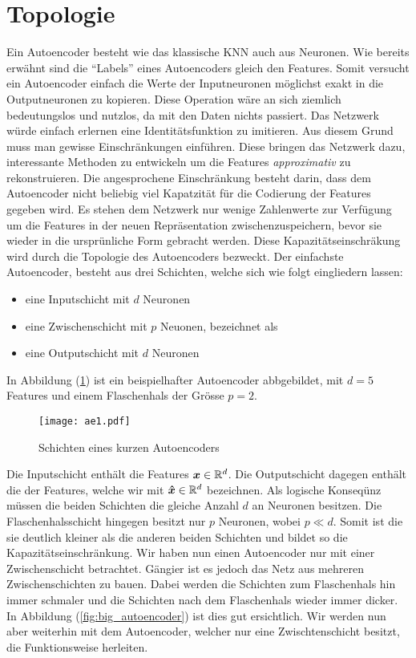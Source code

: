 \section{Topologie}
Ein Autoencoder besteht wie das klassische KNN auch aus Neuronen.
Wie bereits erwähnt sind die ``Labels'' eines Autoencoders gleich
den Features. Somit versucht ein Autoencoder einfach die Werte der Inputneuronen
möglichst exakt in die Outputneuronen zu kopieren.
Diese Operation wäre an sich ziemlich bedeutungslos und nutzlos, da mit den
Daten nichts passiert. Das Netzwerk würde einfach erlernen eine
Identitätsfunktion zu imitieren.
Aus diesem Grund muss man gewisse Einschränkungen einführen. Diese bringen das Netzwerk dazu,
interessante Methoden zu entwickeln um die Features \textit{approximativ} zu rekonstruieren.
\para{}
Die angesprochene Einschränkung besteht darin, dass dem Autoencoder nicht
beliebig viel Kapatzität für die Codierung der Features gegeben wird.
Es stehen dem Netzwerk nur wenige Zahlenwerte zur Verfügung um die Features
in der neuen Repräsentation zwischenzuspeichern, bevor sie wieder in die ursprünliche Form gebracht werden.
Diese Kapazitätseinschräkung wird durch die Topologie des Autoencoders bezweckt.
\para{}
\bigskip
Der einfachste Autoencoder, besteht aus drei Schichten, welche sich wie folgt
eingliedern lassen:
\begin{itemize}
\item{eine Inputschicht mit $d$ Neuronen}
\item{eine Zwischenschicht mit $p$ Neuonen, bezeichnet als }
\item{eine Outputschicht mit $d$ Neuronen}
\end{itemize}
In Abbildung (\ref{fig:basic_autoencoder}) ist
ein beispielhafter Autoencoder abbgebildet, mit $d = 5$ Features und einem
Flaschenhals der Grösse $p = 2$.
\begin{figure}[h!]
  \centering
  \texttt{[image: ae1.pdf]}
  \caption{Schichten eines kurzen Autoencoders}
  \label{fig:basic_autoencoder}
\end{figure}
\para{}
Die Inputschicht enthält die Features $\bm{x} \in \mathbb{R}^d$. Die Outputschicht dagegen
enthält die  der Features, welche wir mit $\bm{\hat{x}} \in \mathbb{R}^d$
bezeichnen. Als logische Konseqünz müssen die beiden Schichten die gleiche
Anzahl $d$ an Neuronen besitzen.
Die Flaschenhalsschicht hingegen besitzt nur $p$ Neuronen, wobei $p \ll d$.
Somit ist die sie deutlich kleiner als die anderen beiden Schichten und bildet
so die Kapazitätseinschränkung.
\para{}
Wir haben nun einen Autoencoder nur mit einer Zwischenschicht betrachtet.
Gängier ist es jedoch das Netz aus mehreren Zwischenschichten zu bauen. Dabei
werden die Schichten zum Flaschenhals hin immer schmaler und die Schichten nach
dem Flaschenhals wieder immer dicker. In Abbildung (\ref{fig:big_autoencoder})
ist dies gut ersichtlich. Wir werden nun aber weiterhin mit dem Autoencoder,
welcher nur eine Zwischtenschicht besitzt, die Funktionsweise herleiten.

